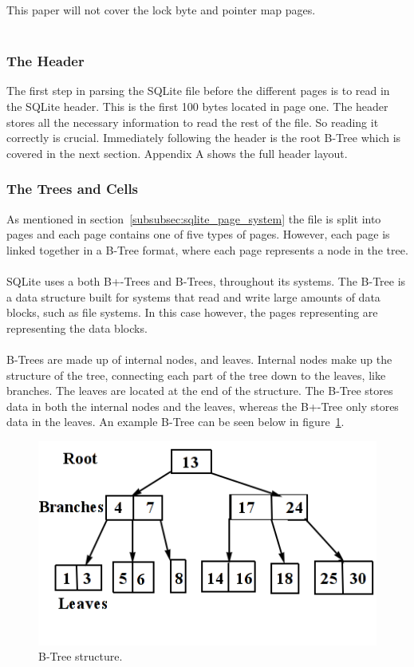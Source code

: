 This paper will not cover the lock byte and pointer map pages. 
\\\\
\subsubsection{The Header}
\label{subsubsec:sqlite_page_hader}

The first step in parsing the SQLite file before the different pages is to read in the SQLite header. This is the first 100 bytes located in page one. The header stores all the necessary information to read the rest of the file. So reading it correctly is crucial. Immediately following the header is the root B-Tree which is covered in the next section. Appendix A shows the full header layout.
\\
\subsubsection{The Trees and Cells}
\label{subsubsec:sqlite_trees_and_cells}

As mentioned in section~\ref{subsubsec:sqlite_page_system} the file is split into pages and each page contains one of five types of pages. However, each page is linked together in a B-Tree format, where each page represents a node in the tree. 
\\\\
SQLite uses a both B+-Trees and B-Trees, throughout its systems. The B-Tree is a data structure built for systems that read and write large amounts of data blocks, such as file systems. In this case however, the pages representing are representing the data blocks.
\\\\
B-Trees are made up of internal nodes, and leaves. Internal nodes make up the structure of the tree, connecting each part of the tree down to the leaves, like branches. The leaves are located at the end of the structure. The B-Tree stores data in both the internal nodes and the leaves, whereas the B+-Tree only stores data in the leaves. An example B-Tree can be seen below in figure~\ref{fig:b-tree}.

\begin{figure}[H]
	\centering
	\includegraphics[scale=0.5]{images/b-tree.png}
	\caption{B-Tree structure.}
	\label{fig:b-tree}
\end{figure}

